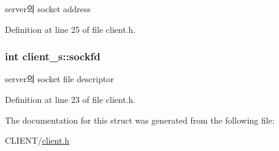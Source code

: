 server의 socket address 



Definition at line 25 of file client.\-h.

\hypertarget{structclient__s_a409a70b3071eaf5be18d0439d256756a}{
\subsubsection[{sockfd}]{\setlength{\rightskip}{0pt plus 5cm}int client\-\_\-s\-::sockfd}}\label{structclient__s_a409a70b3071eaf5be18d0439d256756a}


server의 socket file descriptor 



Definition at line 23 of file client.\-h.



The documentation for this struct was generated from the following file\-:\begin{DoxyCompactItemize}
\item 
C\-L\-I\-E\-N\-T/\hyperlink{client_8h}{client.\-h}\end{DoxyCompactItemize}
